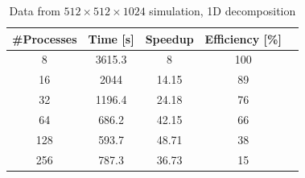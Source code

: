 \begin{table}
\caption{Data from $512\times 512\times 1024$ simulation, 1D decomposition}
\begin{center}
\begin{tabular}{c c c c c}
\toprule
\textbf{\#Processes} & \textbf{Time [s]} & \textbf{Speedup} & \textbf{Efficiency [\%]}\\
\midrule
8 & 3615.3 & 8 & 100\\
16 & 2044 & 14.15 & 89\\
32 & 1196.4 & 24.18 & 76\\
64 & 686.2 & 42.15 & 66\\
128 & 593.7 & 48.71 & 38 \\
256 & 787.3 & 36.73 & 15\\
\bottomrule
\end{tabular}
\end{center}
\label{512data}
\end{table}

